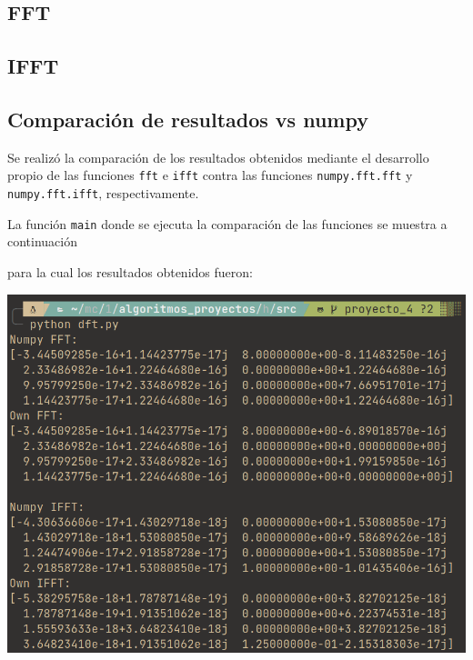 \documentclass[letterpaper, 12pt]{article}
\newcommand{\parg}{\par \hfill \break}
\begin{document}
\subsection{FFT}
\label{sec:org9d3c8b7}

\subsection{IFFT}
\label{sec:orga4b9070}

\subsection{Comparación de resultados vs numpy}
\label{sec:orgb62f4ac}
\noindent
Se realizó la comparación de los resultados obtenidos mediante el desarrollo
propio de las funciones \texttt{fft} e \texttt{ifft} contra las funciones \texttt{numpy.fft.fft} y
\texttt{numpy.fft.ifft}, respectivamente.
\parg

La función \texttt{main} donde se ejecuta la comparación de las funciones se muestra a
continuación


\parg
para la cual los resultados obtenidos fueron:
\begin{center}
\includegraphics[width=.9\linewidth]{./img/resultados_fft.png}
\end{center}
\end{document}
